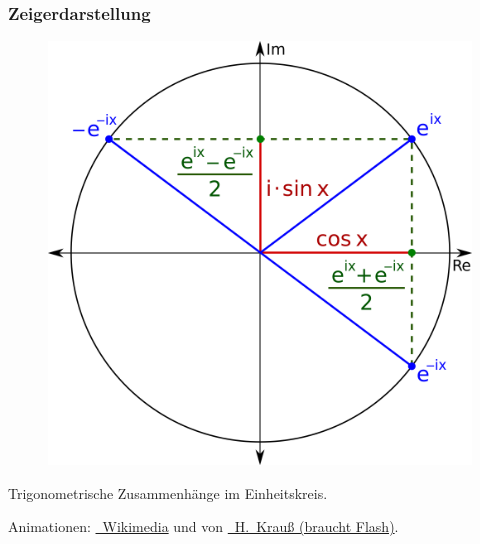 \begin{frame}
  \frametitle{Zeigerdarstellung}

  \begin{center}
    \begin{figure}
      \includegraphics[width=\textwidth,height=0.5\textheight,keepaspectratio]{a11/Sine_Cosine_Exponential_qtl1.png}
    \end{figure}
    \normalsize Trigonometrische Zusammenhänge im Einheitskreis.
  \end{center}

  Animationen:
  \href{http://commons.wikimedia.org/wiki/File:Einheitskreis_mit_Sinus_und_Kosinusfunktion.gif}{\ExternalLink~Wikimedia}
  und von \href{http://www.hutschdorf.de/flash/sinus.htm}{\ExternalLink~H.~Krauß (braucht Flash)}.

\end{frame}


